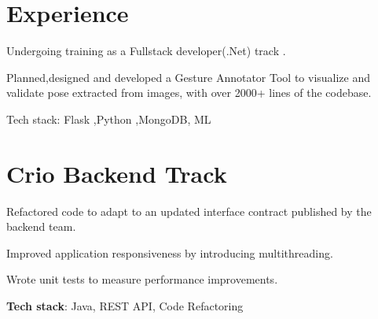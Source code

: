 \documentclass[]{deedy-resume-openfont}
\begin{document}
\begin{minipage}[t]{0.66\textwidth} 


\section{Experience}



\vspace{\topsep} %
\begin{tightemize}\item Undergoing training as a Fullstack developer(.Net) track .
\end{tightemize}



\vspace{\topsep} %
\begin{tightemize}\item Planned,designed and developed a Gesture Annotator Tool to visualize and
validate pose extracted from  images, with over 2000+ lines of the codebase.
\item Tech stack: Flask ,Python ,MongoDB, ML
\end{tightemize}


\sectionsep


\section{Crio Backend Track}


\begin{tightemize}
\item Refactored code to adapt to an updated interface contract published by the backend team.
\item Improved application responsiveness by introducing multithreading.
\item Wrote unit tests to measure performance improvements.
\item \textbf{Tech stack}: Java, REST API, Code Refactoring
\end{tightemize}


\end{minipage}
\end{document}
